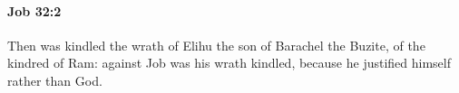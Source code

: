 
		\paragraph{Job 32:2} %
			\label{JOB-32-2}

			Then was kindled the wrath of Elihu the son of Barachel the Buzite, of the kindred of Ram: against Job was his wrath kindled, because he justified himself rather than God.


